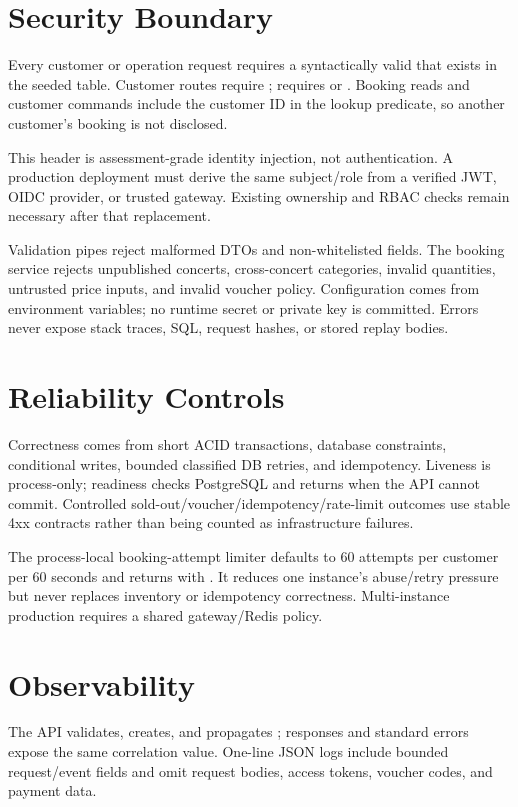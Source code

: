 \section{Security Boundary}
Every customer or operation request requires a syntactically valid
 that exists in the seeded  table. Customer routes
require ;  requires  or
. Booking reads and customer commands include the customer ID in
the lookup predicate, so another customer's booking is not disclosed.

This header is assessment-grade identity injection, not authentication. A
production deployment must derive the same subject/role from a verified JWT,
OIDC provider, or trusted gateway. Existing ownership and RBAC checks remain
necessary after that replacement.

Validation pipes reject malformed DTOs and non-whitelisted fields. The booking
service rejects unpublished concerts, cross-concert categories, invalid
quantities, untrusted price inputs, and invalid voucher policy. Configuration
comes from environment variables; no runtime secret or private key is committed.
Errors never expose stack traces, SQL, request hashes, or stored replay bodies.

\section{Reliability Controls}
Correctness comes from short ACID transactions, database constraints,
conditional writes, bounded classified DB retries, and idempotency. Liveness is
process-only; readiness checks PostgreSQL and returns  when the API
cannot commit. Controlled sold-out/voucher/idempotency/rate-limit outcomes use
stable 4xx contracts rather than being counted as infrastructure failures.

The process-local booking-attempt limiter defaults to 60 attempts per customer
per 60 seconds and returns  with . It reduces one
instance's abuse/retry pressure but never replaces inventory or idempotency
correctness. Multi-instance production requires a shared gateway/Redis policy.

\section{Observability}
The API validates, creates, and propagates ; responses and
standard errors expose the same correlation value. One-line JSON logs include
bounded request/event fields and omit request bodies, access tokens, voucher
codes, and payment data.

